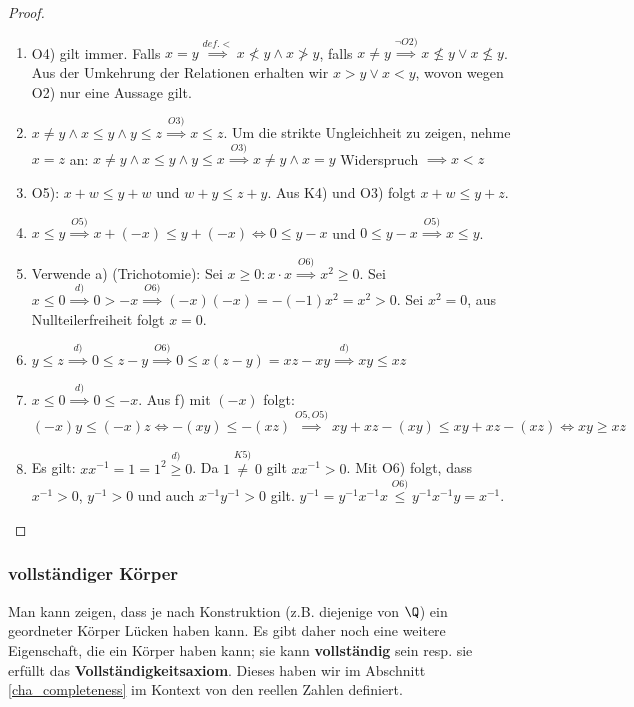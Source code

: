 \begin{proof}\ 
\begin{enumerate}[label=\alph*)]
    \item O4) gilt immer. Falls $x = y \stackrel{def. <}{\implies} x \nless y \land x \ngtr y$, falls $x \neq y \stackrel{\neg O2)}{\implies} x \nleq y \lor x \nleq y$. Aus der Umkehrung der Relationen erhalten wir $x > y \lor x < y$, wovon wegen O2) nur eine Aussage gilt.
    \item $x \neq y \land x \leq y \land y \leq z \stackrel{O3)}{\implies} x \leq z$. Um die strikte Ungleichheit zu zeigen, nehme $x = z$ an: $x \neq y \land x \leq y \land y \leq x \stackrel{O3)}{\implies}  x \neq y \land x = y$ Widerspruch $\implies x < z$
    \item O5): $x + w \leq y + w$ und $w + y \leq z + y$. Aus K4) und O3) folgt $x + w \leq y + z$.
    \item $x \leq y \stackrel{O5)}{\implies} x + (-x) \leq y + (-x) \iff 0 \leq y - x$ und $0 \leq y - x \stackrel{O5)}{\implies} x \leq y$.
    \item Verwende a) (Trichotomie): Sei $x \geq 0 : x \cdot x \stackrel{O6)}{\implies} x^2 \geq 0$. Sei $x \leq 0 \stackrel{d)}{\implies} 0 > -x \stackrel{O6)}{\implies} (-x)(-x) = -(-1)x^2 = x^2 > 0$. Sei $x^2=0$, aus Nullteilerfreiheit folgt $x=0$.
    \item $y \leq z \stackrel{d)}{\implies} 0 \leq z - y \stackrel{O6)}{\implies} 0 \leq x(z-y) = xz - xy \stackrel{d)}{\implies} xy \leq xz$
    \item $x \leq 0 \stackrel{d)}{\implies} 0 \leq -x$. Aus f) mit $(-x)$ folgt: $(-x)y \leq (-x)z \iff -(xy) \leq -(xz) \stackrel{O5, O5)}{\implies} xy + xz -(xy) \leq xy + xz -(xz) \iff xy \geq xz$
    \item Es gilt: $xx^{-1} = 1 = 1^2 \stackrel{d)}{\geq} 0$. Da $1 \stackrel{K5)}{\neq} 0$ gilt $xx^{-1} > 0$. Mit O6) folgt, dass $x^{-1} > 0$, $y^{-1} > 0$ und auch $x^{-1}y^{-1} > 0$ gilt. $y^{-1}=y^{-1}x^{-1}x \stackrel{O6)}{\leq}y^{-1}x^{-1}y = x^{-1}$.
\end{enumerate}
\end{proof}

\subsubsection{vollständiger Körper}
Man kann zeigen, dass je nach Konstruktion (z.B. diejenige von $\Q$) ein geordneter Körper Lücken haben kann. Es gibt daher noch eine weitere Eigenschaft, die ein Körper haben kann; sie kann \textbf{vollständig} sein resp. sie erfüllt das \textbf{Vollständigkeitsaxiom}. Dieses haben wir im Abschnitt \ref{cha_completeness} im Kontext von den reellen Zahlen definiert.